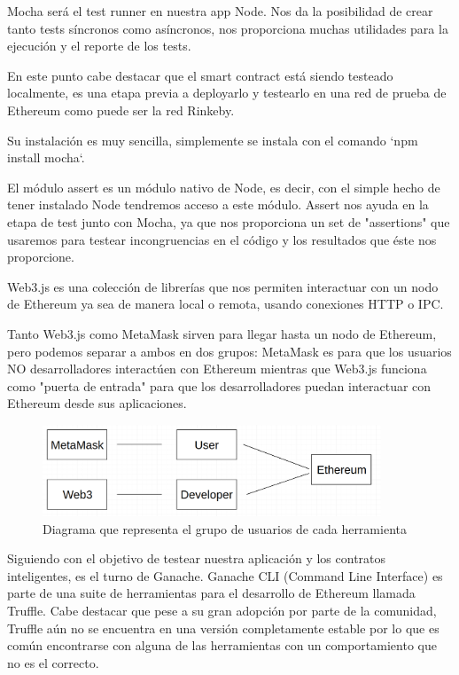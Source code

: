 Mocha será el test runner en nuestra app Node. Nos da la posibilidad de crear tanto tests síncronos
como asíncronos, nos proporciona muchas utilidades para la ejecución y el reporte de los tests.

En este punto cabe destacar que el smart contract está siendo testeado localmente, es una etapa
previa a deployarlo y testearlo en una red de prueba de Ethereum como puede ser la red Rinkeby.

Su instalación es muy sencilla, simplemente se instala con el comando `npm install mocha`.


El módulo assert es un módulo nativo de Node, es decir, con el simple hecho de tener instalado
Node tendremos acceso a este módulo. Assert nos ayuda en la etapa de test junto con Mocha, ya que 
nos proporciona un set de "assertions" que usaremos para testear incongruencias en el código
y los resultados que éste nos proporcione.

Web3.js es una colección de librerías que nos permiten interactuar con un nodo de Ethereum 
ya sea de manera local o remota, usando conexiones HTTP o IPC.

Tanto Web3.js como MetaMask sirven para llegar hasta un nodo de Ethereum, pero podemos separar 
a ambos en dos grupos: MetaMask es para que los usuarios NO desarrolladores interactúen con 
Ethereum mientras que Web3.js funciona como "puerta de entrada" para que los desarrolladores
puedan interactuar con Ethereum desde sus aplicaciones.

\begin{figure}[htbp!] 
\centering    
\includegraphics[width=0.9\textwidth]{metaweb3}
\caption[MetaWeb3]{Diagrama que representa el grupo de usuarios de cada herramienta}
\label{fig:metamask-web3}
\end{figure}


Siguiendo con el objetivo de testear nuestra aplicación y los contratos inteligentes, es el turno 
de Ganache. Ganache CLI (Command Line Interface) es parte de una suite de herramientas para el 
desarrollo de Ethereum llamada Truffle. Cabe destacar que pese a su gran adopción por parte de la 
comunidad, Truffle aún no se encuentra en una versión completamente estable por lo que es común
encontrarse con alguna de las herramientas con un comportamiento que no es el correcto.

